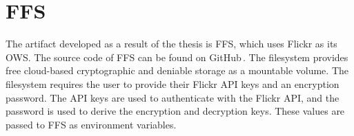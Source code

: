\section{FFS}
\label{sec:res_ffs}
The artifact developed as a result of the thesis is \gls{FFS}, which uses Flickr as its \gls{OWS}. The source code of \gls{FFS} can be found on GitHub\,\cite{olssonFejkFileSystem2022}. The filesystem provides free cloud-based cryptographic and deniable storage as a mountable volume. The filesystem requires the user to provide their Flickr API keys and an encryption password. The API keys are used to authenticate with the Flickr API, and the password is used to derive the encryption and decryption keys. These values are passed to \gls{FFS} as environment variables.
